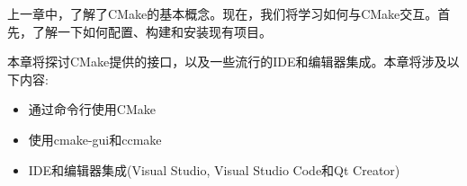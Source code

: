 上一章中，了解了CMake的基本概念。现在，我们将学习如何与CMake交互。首先，了解一下如何配置、构建和安装现有项目。

本章将探讨CMake提供的接口，以及一些流行的IDE和编辑器集成。本章将涉及以下内容:

\begin{itemize}
\item 
通过命令行使用CMake

\item 
使用cmake-gui和ccmake

\item 
IDE和编辑器集成(Visual Studio, Visual Studio Code和Qt Creator)
\end{itemize}